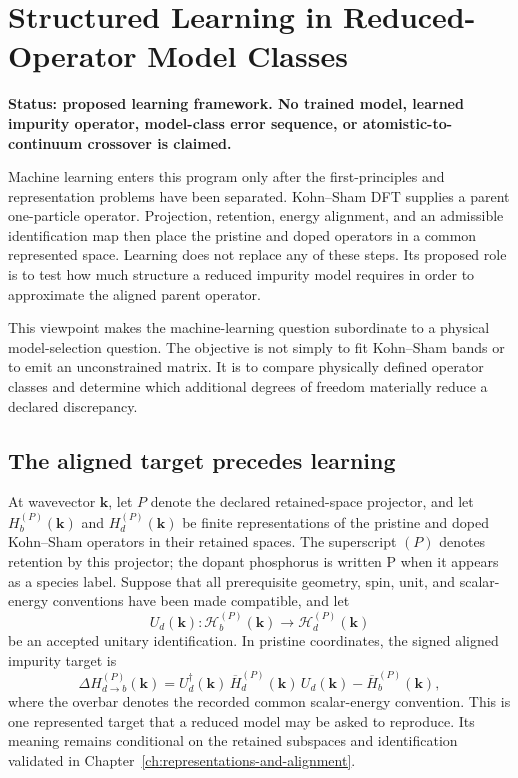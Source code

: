 \chapter{Structured Learning in Reduced-Operator Model Classes}
\label{ch:structured-learning}

\textbf{Status: proposed learning framework. No trained model, learned impurity
operator, model-class error sequence, or atomistic-to-continuum crossover is
claimed.}

Machine learning enters this program only after the first-principles and
representation problems have been separated. Kohn--Sham DFT supplies a parent
one-particle operator. Projection, retention, energy alignment, and an
admissible identification map then place the pristine and doped operators in a
common represented space. Learning does not replace any of these steps. Its
proposed role is to test how much structure a reduced impurity model requires
in order to approximate the aligned parent operator.

This viewpoint makes the machine-learning question subordinate to a physical
model-selection question. The objective is not simply to fit Kohn--Sham bands
or to emit an unconstrained matrix. It is to compare physically defined
operator classes and determine which additional degrees of freedom materially
reduce a declared discrepancy.

\section{The aligned target precedes learning}

At wavevector $\mathbf k$, let $P$ denote the declared retained-space
projector, and let $H_b^{(P)}(\mathbf k)$ and $H_d^{(P)}(\mathbf k)$ be finite
representations of the pristine and doped Kohn--Sham operators in their retained
spaces. The superscript $(P)$ denotes retention by this projector; the dopant
phosphorus is written $\mathrm P$ when it appears as a species label. Suppose that all prerequisite
geometry, spin, unit, and scalar-energy conventions have been made compatible,
and let
\begin{equation}
  U_d(\mathbf k):
  \mathcal H_b^{(P)}(\mathbf k)
  \longrightarrow
  \mathcal H_d^{(P)}(\mathbf k)
\end{equation}
be an accepted unitary identification. In pristine coordinates, the signed
aligned impurity target is
\begin{equation}
  \Delta H_{d\to b}^{(P)}(\mathbf k)
  =
  U_d^{\dagger}(\mathbf k)\,
  \overline H_d^{(P)}(\mathbf k)\,
  U_d(\mathbf k)
  -
  \overline H_b^{(P)}(\mathbf k),
  \label{eq:learning-aligned-target}
\end{equation}
where the overbar denotes the recorded common scalar-energy convention. This
is one represented target that a reduced model may be asked to reproduce. Its
meaning remains conditional on the retained subspaces and identification
validated in Chapter~\ref{ch:representations-and-alignment}.

